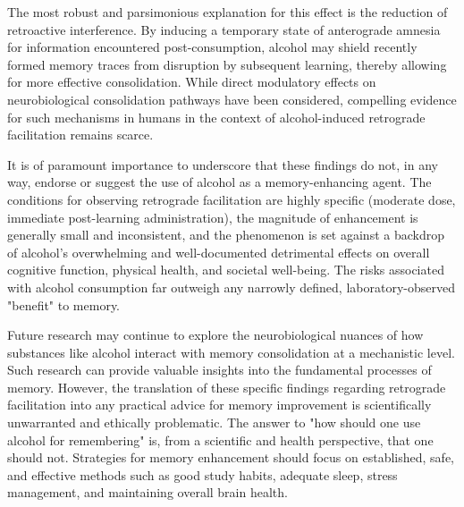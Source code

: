 \documentclass[12pt, a4paper]{article}
\begin{document}
The most robust and parsimonious explanation for this effect is the reduction of retroactive interference. By inducing a temporary state of anterograde amnesia for information encountered post-consumption, alcohol may shield recently formed memory traces from disruption by subsequent learning, thereby allowing for more effective consolidation. While direct modulatory effects on neurobiological consolidation pathways have been considered, compelling evidence for such mechanisms in humans in the context of alcohol-induced retrograde facilitation remains scarce.

It is of paramount importance to underscore that these findings do not, in any way, endorse or suggest the use of alcohol as a memory-enhancing agent. The conditions for observing retrograde facilitation are highly specific (moderate dose, immediate post-learning administration), the magnitude of enhancement is generally small and inconsistent, and the phenomenon is set against a backdrop of alcohol's overwhelming and well-documented detrimental effects on overall cognitive function, physical health, and societal well-being. The risks associated with alcohol consumption far outweigh any narrowly defined, laboratory-observed "benefit" to memory.

Future research may continue to explore the neurobiological nuances of how substances like alcohol interact with memory consolidation at a mechanistic level. Such research can provide valuable insights into the fundamental processes of memory. However, the translation of these specific findings regarding retrograde facilitation into any practical advice for memory improvement is scientifically unwarranted and ethically problematic. The answer to "how should one use alcohol for remembering" is, from a scientific and health perspective, that one should not. Strategies for memory enhancement should focus on established, safe, and effective methods such as good study habits, adequate sleep, stress management, and maintaining overall brain health.

% 
\end{document}

